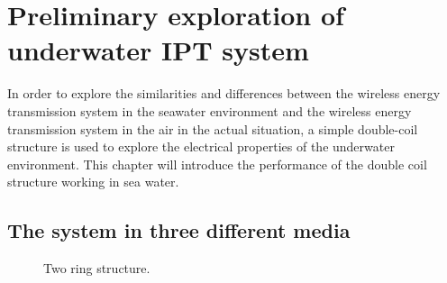 \chapter{Preliminary exploration of underwater IPT system}

In order to explore the similarities and differences between the wireless energy transmission system in the seawater environment and the wireless energy transmission system in the air in the actual situation, a simple double-coil structure is used to explore the electrical properties of the underwater environment. This chapter will introduce the performance of the double coil structure working in sea water.




\section{The system in three different media}

\begin{figure}[!b]
    \caption{Two ring structure.}
    \label{fig:3_two_ring_coil}
\end{figure}

